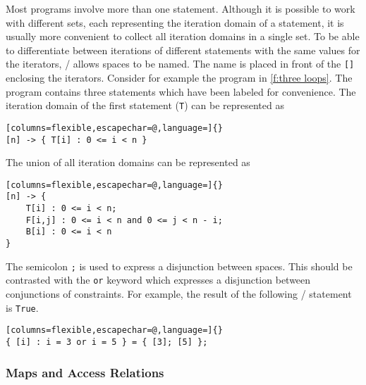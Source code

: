 Most programs involve more than one statement.
Although it is possible to work with different sets, each
representing the iteration domain of a statement,
it is usually more convenient to collect all iteration domains
in a single set.  To be able to differentiate between iterations
of different statements with the same values for the iterators,
\isl/ allows spaces to be named.  The name is placed in front
of the \lstinline![]! enclosing the iterators.
Consider for example the program in \autoref{f:three loops}.
The program contains three statements which have been labeled
for convenience.
The iteration domain of the first statement (\lstinline!T!)
can be represented as
\begin{lstlisting}[columns=flexible,escapechar=@,language=]{}
[n] -> { T[i] : 0 <= i < n }
\end{lstlisting}
The union of all iteration domains can be represented as
\begin{lstlisting}[columns=flexible,escapechar=@,language=]{}
[n] -> {
    T[i] : 0 <= i < n;
    F[i,j] : 0 <= i < n and 0 <= j < n - i;
    B[i] : 0 <= i < n
}
\end{lstlisting}
The semicolon \lstinline{;} is used to express a disjunction
between spaces.  This should be contrasted with the \lstinline{or}
keyword which expresses a disjunction between conjunctions of constraints.
For example, the result of the following \iscc/ statement is
\lstinline{True}.
\begin{lstlisting}[columns=flexible,escapechar=@,language=]{}
{ [i] : i = 3 or i = 5 } = { [3]; [5] };
\end{lstlisting}

\subsubsection{Maps and Access Relations}

